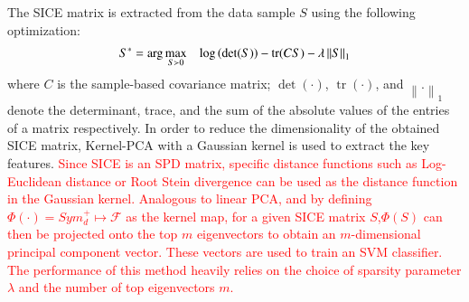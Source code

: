 \documentclass[preprint,12pt]{elsarticle}
\newcommand\norm[1]{\left\lVert#1\right\rVert}
\begin{document}
The SICE matrix is extracted from the data sample $S$ using the following optimization: 
\begin{align}
S^* = \operatorname{arg} \max\limits_{S\succ 0} \hspace{3mm} \log \left( \det(S) \right) - \operatorname{tr}(CS) - \lambda \norm{S}_1
\end{align}
where $C$ is the sample-based covariance matrix; $\det(·)$, $\operatorname{tr}(·)$,
and $\norm{.}_1$ denote the determinant, trace, and the sum of the absolute values of the entries of a matrix respectively. 
In order to reduce the dimensionality of the obtained SICE matrix, Kernel-PCA with a Gaussian kernel is used  to extract the key features.
\textcolor{red}{Since SICE is an SPD matrix, specific distance functions such as Log-Euclidean distance\cite{r49} or Root Stein divergence\cite{r50} can be used as the distance function in the Gaussian kernel. Analogous to linear PCA, and by defining 
	$\Phi(\cdot) = Sym^{+}_{d} \mapsto \mathcal{F}$ as the kernel map, 
	for a given SICE matrix $S$,$\Phi(S)$ can then be projected onto the top $m$ eigenvectors to obtain an $m$-dimensional principal
	component vector. These vectors are used to train an SVM classifier. The performance of this method heavily relies on the choice of sparsity parameter $\lambda$ and the number of top eigenvectors $m$. }   
\end{document}
